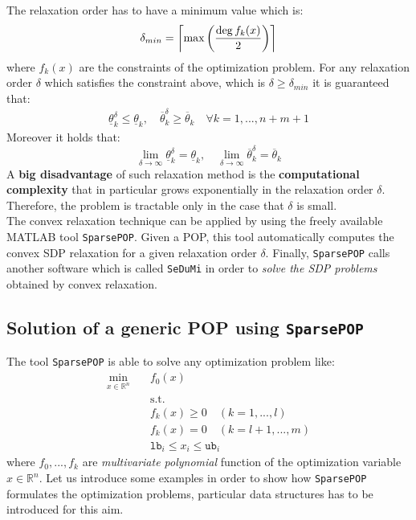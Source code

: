\noindent
The relaxation order has to have a minimum value which is:
\begin{equation}
        \delta_{min} = \ceil[\bigg]{ \max \bigg(
            \frac{\deg{f_k(x)}}{2}
    \bigg)}
\end{equation}
where $f_k(x)$ are the constraints of the optimization problem. 
For any relaxation order $\delta$ which satisfies the constraint above, which is $\delta \ge \delta_{min}$ it is guaranteed that:
\begin{align*}
    \underline{\theta}_k^\delta \le \underline{\theta}_k, \quad 
    \overline{\theta}_k^\delta \ge \overline{\theta}_k \quad \forall k=1,...,n+m+1 
\end{align*}
Moreover it holds that:
{\Large{
    \begin{equation}
        \lim_{\delta\to\infty}  \underline{\theta}_k^\delta = \underline{\theta}_k, \quad
        \lim_{\delta\to\infty} \overline{\theta}_k^\delta = \overline{\theta}_k
    \end{equation}
}}
A \textbf{big disadvantage} of such relaxation method is the \textbf{computational complexity} that in particular grows exponentially in the relaxation order $\delta$. Therefore, the problem is tractable only in the case that $\delta$ is small. \\
The convex relaxation technique can be applied by using the freely available MATLAB tool \texttt{SparsePOP}. Given a POP, this tool automatically computes the convex SDP relaxation for a given relaxation order $\delta$. Finally, \texttt{SparsePOP} calls another software which is called \texttt{SeDuMi} in order to \textit{solve the SDP problems} obtained by convex relaxation.

\subsection{Solution of a generic POP using \texttt{SparsePOP}}
The tool \texttt{SparsePOP} is able to solve any optimization problem like:
{\large{
    \begin{align*}
        \min_{x\in\mathbb{R}^n}  \quad & f_0(x)\\
        &\text{s.t.}\\
        &f_k(x)\ge 0 \quad (k=1,...,l)\\
        &f_k(x)=0 \quad (k=l+1, ..., m)\\
        &\texttt{lb}_i \le x_i \le \texttt{ub}_i
    \end{align*}
}}
where $f_0,...,f_k$ are \textit{multivariate polynomial} function of the optimization variable $x\in\mathbb{R}^n$.
Let us introduce some examples in order to show how \texttt{SparsePOP} formulates the optimization problems, particular data structures has to be introduced for this aim.

